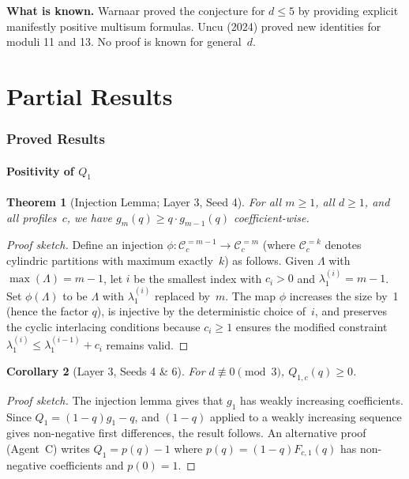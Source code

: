 \documentclass[11pt]{article}
\newtheorem{theorem}{Theorem}[section]
\newtheorem{corollary}[theorem]{Corollary}
\theoremstyle{definition}
\begin{document}
\noindent\textbf{What is known.} Warnaar proved the conjecture for $d \leq 5$ by providing explicit manifestly positive multisum formulas. Uncu (2024) proved new identities for moduli 11 and 13. No proof is known for general~$d$.

\part{Partial Results}

\section{Proved Results}

\subsection{Positivity of \texorpdfstring{$Q_1$}{Q\_1}}\label{sec:Q1}

\begin{theorem}[Injection Lemma; Layer 3, Seed 4]\label{thm:injection}
For all $m \geq 1$, all $d \geq 1$, and all profiles~$c$, we have $g_m(q) \geq q \cdot g_{m-1}(q)$ coefficient-wise.
\end{theorem}

\begin{proof}[Proof sketch]
Define an injection $\phi \colon \mathcal{C}_{c}^{=m-1} \to \mathcal{C}_{c}^{=m}$ (where $\mathcal{C}_c^{=k}$ denotes cylindric partitions with maximum exactly~$k$) as follows. Given $\Lambda$ with $\max(\Lambda) = m-1$, let $i$ be the smallest index with $c_i > 0$ and $\lambda^{(i)}_1 = m-1$. Set $\phi(\Lambda)$ to be $\Lambda$ with $\lambda^{(i)}_1$ replaced by~$m$. The map $\phi$ increases the size by~1 (hence the factor $q$), is injective by the deterministic choice of~$i$, and preserves the cyclic interlacing conditions because $c_i \geq 1$ ensures the modified constraint $\lambda^{(i)}_1 \leq \lambda^{(i-1)}_1 + c_i$ remains valid.
\end{proof}

\begin{corollary}[Layer 3, Seeds 4 \& 6]\label{cor:Q1pos}
For $d \not\equiv 0 \pmod{3}$, $Q_{1,c}(q) \geq 0$.
\end{corollary}

\begin{proof}[Proof sketch]
The injection lemma gives that $g_1$ has weakly increasing coefficients. Since $Q_1 = (1-q) g_1 - q$, and $(1-q)$ applied to a weakly increasing sequence gives non-negative first differences, the result follows. An alternative proof (Agent~C) writes $Q_1 = p(q) - 1$ where $p(q) = (1-q) F_{c,1}(q)$ has non-negative coefficients and $p(0) = 1$.
\end{proof}
\end{document}
